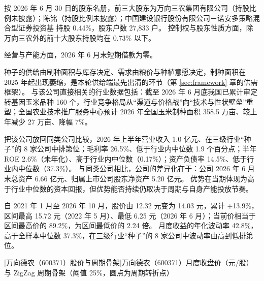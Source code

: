  按 2026 年 6 月 30 日的股东名册，前三大股东为万向三农集团有限公司（持股比例未披露）；陈铭（持股比例未披露）；中国建设银行股份有限公司－诺安多策略混合型证券投资基 持股 0.44\%，股东户数 27,833 户。 控制权与股东性质方面，除万向三农外的前十大股东持股均在 0.73\% 以下。

 经营与产能方面，2026 年 6 月末短期借款为零。

 种子的供给由制种面积与库存决定、需求由粮价与种植意愿决定，制种面积在 2025 年起出现萎缩，是本轮供给端最先出清的环节（第 \ref{sec:framework} 章的供需框架）。 与该公司直接相关的行业数据包括：截至 2026 年 6 月底我国已累计审定转基因玉米品种 160 个，行业竞争格局从“渠道与价格战”向“技术与性状壁垒”重塑；全国农业技术推广服务中心预计 2026 年全国玉米制种面积 358.5 万亩、较上年减少 27 万亩、降幅 7\%。

 把该公司放回同类公司比较，2026 年上半年营业收入 1.0 亿元、在三级行业“种子”的 8 家公司中排第位；毛利率 26.5\%、低于行业内中位数 1.9 个百分点；半年 ROE 2.6\%（未年化）、高于行业内中位数（0.17\%）；资产负债率 14.5\%、低于行业内中位数（37.3\%）。 与同类公司相比，公司的差异化在于：公司 2026 年 6 月末总资产 6.66 亿元、归属上市公司股东净资产 5.20 亿元。 优势在当期体现为高于行业中位数的资本回报，但优势能否持续仍取决于周期与自身产能投放节奏。

 自 2021 年 1 月至 2026 年 10 月，股价由 12.32 元变为 14.03 元，累计 +13.9\%，区间最高 15.72 元（2022 年 5 月）、最低 6.25 元（2026 年 6 月）；当前价相当于区间最高价的 89.2\%，为区间最低价的 2.24 倍。 月度收益的年化波动率 42.8\%，高于全样本中位数 37.3\%，在三级行业“种子”的 8 家公司中波动率由高到低排第位。

\begin{center}
\begin{minipage}{\textwidth}\centering
{}

[万向德农（600371）股价与周期骨架]{万向德农（600371）月度收盘价（元/股）与 ZigZag 周期骨架（阈值 25\%，圆点为周期转折点）}
\end{minipage}
\end{center}


